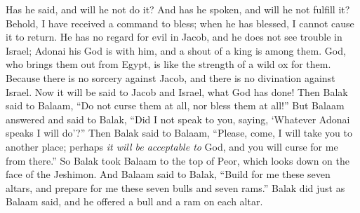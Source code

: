 \begin{biblechapter}
Has he said, and will he not do it? 
And has he spoken, and will he not fulfill it?
\verse Behold, I have received a command to bless; 
when he has blessed, I cannot cause it to return.
\verse He has no regard for evil in Jacob, 
and he does not see trouble in Israel; 
Adonai his God is with him, 
and a shout of a king is among them.
\verse God, who brings them out from Egypt, 
is like the strength of a wild ox for them.
\verse Because there is no sorcery against Jacob, 
and there is no divination against Israel. 
Now it will be said to Jacob and Israel, 
what God has done!
\verse Then Balak said to Balaam, “Do not curse them at all, nor bless them at all!”
\verse But Balaam answered and said to Balak, “Did I not speak to you, saying, ‘Whatever Adonai speaks I will do’?”
\verse Then Balak said to Balaam, “Please, come, I will take you to another place; perhaps \textit{it will be acceptable to} God, and you will curse for me from there.”
\verse So Balak took Balaam to the top of Peor, which looks down on the face of the Jeshimon.
\verse And Balaam said to Balak, “Build for me these seven altars, and prepare for me these seven bulls and seven rams.”
\verse Balak did just as Balaam said, and he offered a bull and a ram on each altar.
\end{biblechapter}


